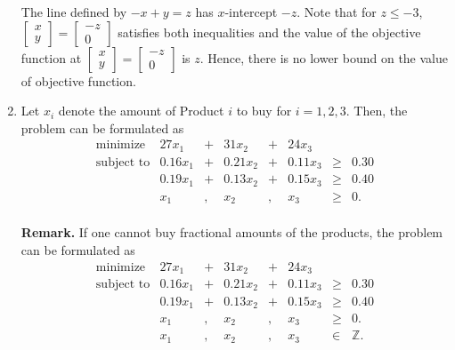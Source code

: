 \begin{enumerate}
  The line defined by \(-x + y = z\) has \(x\)-intercept \(-z\). Note
  that for \(z \leq -3\),
  \(\begin{bmatrix} x\\y \end{bmatrix} = \begin{bmatrix} -z\\ 0\end{bmatrix}\)
  satisfies both inequalities and the value of the objective function at
  \(\begin{bmatrix} x\\y \end{bmatrix} = \begin{bmatrix} -z\\ 0\end{bmatrix}\)
  is \(z\). Hence, there is no lower bound on the value of objective
  function.
\item
  Let \(x_i\) denote the amount of Product \(i\) to buy for
  \(i = 1,2,3\). Then, the problem can be formulated as
  \[\begin{array}{rrcrcrll}
  \mbox{minimize } & 27 x_1 & + & 31 x_2 & + & 24 x_3 \\
  \mbox{subject to} 
  & 0.16 x_1 & + & 0.21 x_2 & + & 0.11 x_3 & \geq & 0.30 \\
  & 0.19 x_1 & + & 0.13 x_2 & + & 0.15 x_3 & \geq & 0.40 \\
  & x_1 & , & x_2 & , & x_3 & \geq & 0. \\
  \end{array}\]

  \textbf{Remark.} If one cannot buy fractional amounts of the products,
  the problem can be formulated as \[\begin{array}{rrcrcrll}
  \mbox{minimize } & 27 x_1 & + & 31 x_2 & + & 24 x_3 \\
  \mbox{subject to} 
  & 0.16 x_1 & + & 0.21 x_2 & + & 0.11 x_3 & \geq & 0.30 \\
  & 0.19 x_1 & + & 0.13 x_2 & + & 0.15 x_3 & \geq & 0.40 \\
  & x_1 & , & x_2 & , & x_3 & \geq & 0. \\
  & x_1 & , & x_2 & , & x_3 & \in & \mathbb{Z}. \\
  \end{array}\]
\end{enumerate}